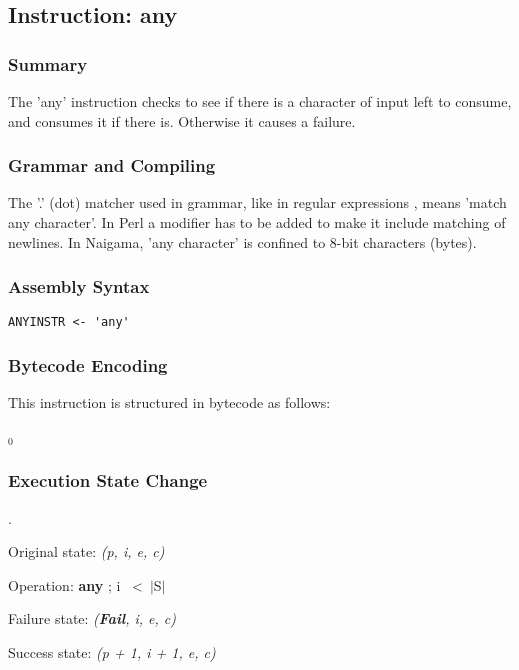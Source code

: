 \subsection{Instruction: any}

\subsubsection{Summary}

The 'any' instruction checks to see if there is a character of input
left to consume, and consumes it if there is. Otherwise it causes a failure.

\subsubsection{Grammar and Compiling}

The '.' (dot) matcher used in grammar, like in regular expressions
\cite{bib:regex}, means 'match any character'. In Perl \cite{bib:perl}
a modifier has to be added to make it include matching of newlines.
In Naigama, 'any character' is confined to 8-bit characters (bytes).

\subsubsection{Assembly Syntax}

\begin{myquote}
\begin{verbatim}
ANYINSTR <- 'any'

\end{verbatim}
\end{myquote}

\subsubsection{Bytecode Encoding}

This instruction is structured in bytecode as follows:

$_0$\ 

\subsubsection{Execution State Change}

.

Original state: \textit{(p, i, e, c)}

Operation: \textbf{any} ; i \ \textless \ $\vert$S$\vert$

Failure state: \textit{(\textbf{Fail}, i, e, c)}

Success state: \textit{(p + 1, i + 1, e, c)}

